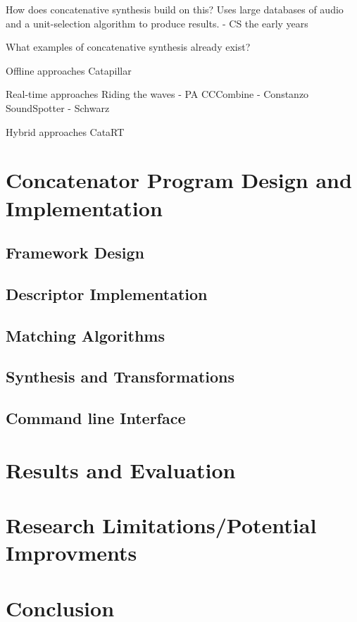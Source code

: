 \documentclass{scrartcl}
\begin{document}
    How does concatenative synthesis build on this?
    Uses large databases of audio and a unit-selection algorithm to produce results. - CS the early years
    
    What examples of concatenative synthesis already exist?

    Offline approaches
    Catapillar

    Real-time approaches
    Riding the waves - PA
    CCCombine - Constanzo
    SoundSpotter - Schwarz

    Hybrid approaches
    CataRT 


    \section*{Concatenator Program Design and Implementation}
    \subsection*{Framework Design}
    \subsection*{Descriptor Implementation}
    \subsection*{Matching Algorithms}
    \subsection*{Synthesis and Transformations}
    \subsection*{Command line Interface}

    \section*{Results and Evaluation}
    \section*{Research Limitations/Potential Improvments}
    \section*{Conclusion}
\end{document}
